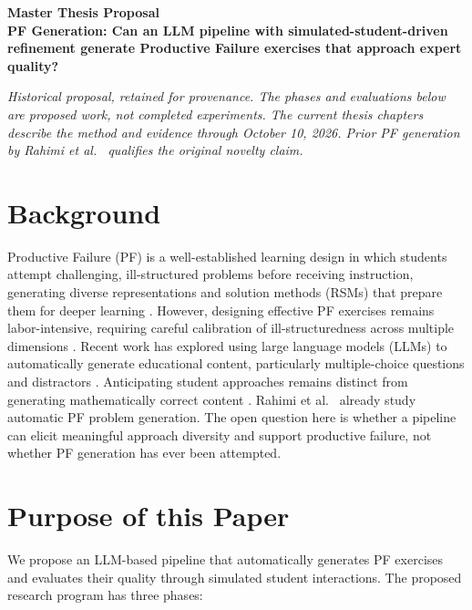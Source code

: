 \documentclass[11pt,a4paper]{article}
\begin{document}
\begin{center}
    {\LARGE \textbf{Master Thesis Proposal}}\\
    {\large \textbf{PF Generation: Can an LLM pipeline with simulated-student-driven refinement generate Productive Failure exercises that approach expert quality?}}
\end{center}
\vspace{0.4cm}
\noindent\textit{Historical proposal, retained for provenance. The phases and evaluations below are proposed work, not completed experiments. The current thesis chapters describe the method and evidence through October 10, 2026. Prior PF generation by Rahimi et al.~\cite{rahimi2025} qualifies the original novelty claim.}

\section*{Background}
Productive Failure (PF) is a well-established learning design in which students attempt challenging, ill-structured problems before receiving instruction, generating diverse representations and solution methods (RSMs) that prepare them for deeper learning \cite{kapur2008,sinha2021}. However, designing effective PF exercises remains labor-intensive, requiring careful calibration of ill-structuredness across multiple dimensions \cite{kapur2009}. Recent work has explored using large language models (LLMs) to automatically generate educational content, particularly multiple-choice questions and distractors \cite{alhazmi2024}. Anticipating student approaches remains distinct from generating mathematically correct content \cite{feng2024,parikh2025}. Rahimi et al.~\cite{rahimi2025} already study automatic PF problem generation. The open question here is whether a pipeline can elicit meaningful approach diversity and support productive failure, not whether PF generation has ever been attempted.
\section*{Purpose of this Paper}

We propose an LLM-based pipeline that automatically generates PF exercises 
and evaluates their quality through simulated student interactions. 
The proposed research program has three phases:
\end{document}
